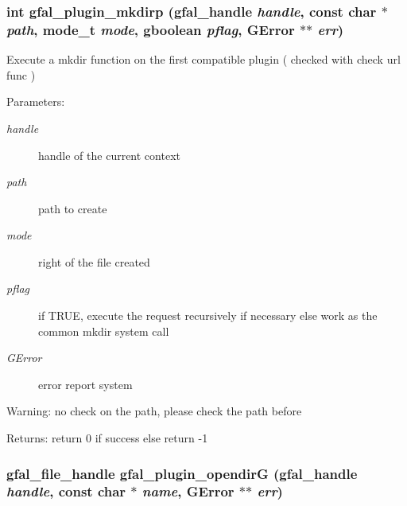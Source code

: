 \subsubsection{\setlength{\rightskip}{0pt plus 5cm}int gfal\_\-plugin\_\-mkdirp (gfal\_\-handle {\em handle}, const char $\ast$ {\em path}, mode\_\-t {\em mode}, gboolean {\em pflag}, GError $\ast$$\ast$ {\em err})}\label{gfal__common__plugin_8h_815a97902a1067b99f9bcc2f63b19e11}


Execute a mkdir function on the first compatible plugin ( checked with check url func ) \begin{Desc}
\item[Parameters:]
\begin{description}
\item[{\em handle}]handle of the current context \item[{\em path}]path to create \item[{\em mode}]right of the file created \item[{\em pflag}]if TRUE, execute the request recursively if necessary else work as the common mkdir system call \item[{\em GError}]error report system \end{description}
\end{Desc}
\begin{Desc}
\item[Warning:]no check on the path, please check the path before \end{Desc}
\begin{Desc}
\item[Returns:]return 0 if success else return -1 \end{Desc}
\subsubsection{\setlength{\rightskip}{0pt plus 5cm}gfal\_\-file\_\-handle gfal\_\-plugin\_\-opendir\-G (gfal\_\-handle {\em handle}, const char $\ast$ {\em name}, GError $\ast$$\ast$ {\em err})}\label{gfal__common__plugin_8h_0f8363d00d0f3418edaef414a84df034}


